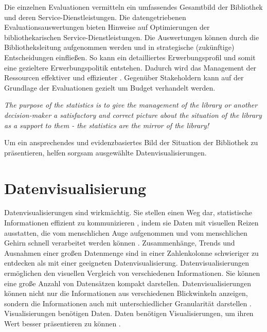 Die einzelnen Evaluationen vermitteln ein umfassendes Gesamtbild der Bibliothek und deren Service-Dienstleistungen. 
Die datengetriebenen Evaluationsauswertungen bieten Hinweise auf Optimierungen der bibliothekarischen Service-Dienstleistungen. 
Die Auswertungen können durch die Bibliotheksleitung aufgenommen werden und in strategische (zukünftige) Entscheidungen einfließen. 
So kann ein detailliertes Erwerbungsprofil und somit eine gezieltere Erwerbungspolitik entstehen. 
Dadurch wird das Management der Ressourcen effektiver und effizienter \cite[vgl.][297]{johnson_peggy_fundamentals_2014}.
Gegenüber Stakeholdern kann auf der Grundlage der Evaluationen gezielt um Budget verhandelt werden.
\begin{displayquote}
    \textit{The purpose of the statistics is to give the management of the library or another decision-maker 
    a satisfactory and correct picture about the situation of the library as a support to them - the statistics are the mirror of the library!}
    \cite[463]{laitinen_markku_library_2013}
\end{displayquote}

Um ein ansprechendes und evidenzbasiertes Bild der Situation der Bibliothek zu präsentieren, helfen sorgsam ausgewählte Datenvisualisierungen.



\clearpage

\section{Datenvisualisierung}
\label{chap:two_two}
Datenvisualisierungen sind wirkmächtig. Sie stellen einen Weg dar, statistische Informationen effizient zu kommunizieren \cite[vgl.][15]{Tufte01}, 
indem sie Daten mit visuellen Reizen ausstatten, die vom menschlichen Auge aufgenommen und vom menschlichen Gehirn schnell verarbeitet werden können \cite[vgl.][32]{few_now_2009}. 
Zusammenhänge, Trends und Ausnahmen einer großen Datenmenge sind in einer Zahlenkolonne schwieriger zu entdecken als mit einer geeigneten Datenvisualisierung.
Datenvisualisierungen ermöglichen den visuellen Vergleich von verschiedenen Informationen. Sie können eine große Anzahl von Datensätzen kompakt darstellen. 
Datenvisualisierungen können nicht nur die Informationen aus verschiedenen Blickwinkeln anzeigen, sondern die Informationen auch
mit unterschiedlicher Granularität darstellen \cite[vgl.][245]{muller_business_2013}.
Visualisierungen benötigen Daten. Daten benötigen Visualisierungen, um ihren Wert besser präsentieren zu können \cite[vgl.][16]{kirk_data_2019}.


